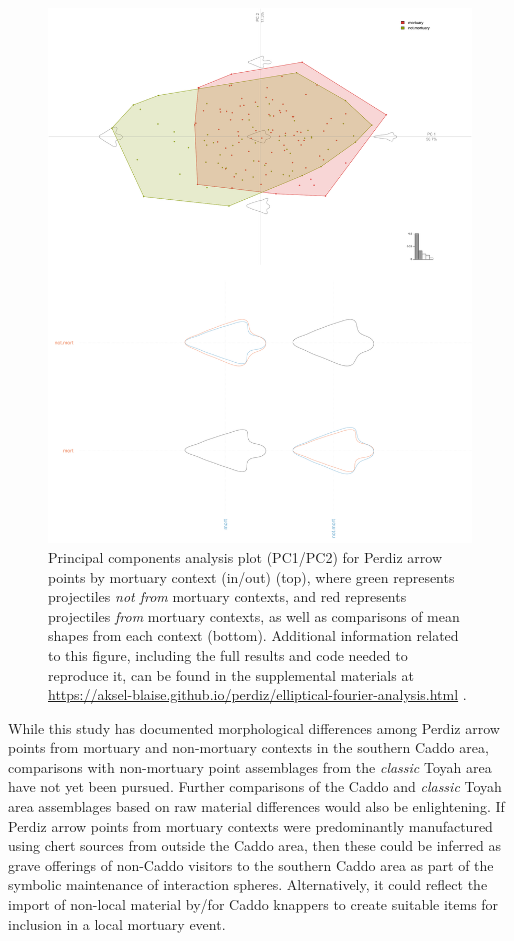 \documentclass[review]{elsarticle}
\begin{document}
\begin{figure}[!]\centering
\includegraphics[width=\linewidth]{context.pdf}
\caption{Principal components analysis plot (PC1/PC2) for Perdiz arrow points by mortuary context (in/out) (top), where green represents projectiles \textit{not from} mortuary contexts, and red represents projectiles \textit{from} mortuary contexts, as well as comparisons of mean shapes from each context (bottom). Additional information related to this figure, including the full results and code needed to reproduce it, can be found in the supplemental materials at \href{https://aksel-blaise.github.io/perdiz/elliptical-fourier-analysis.html}{https://aksel-blaise.github.io/perdiz/elliptical-fourier-analysis.html} \citep{RN8980}.}
\label{fig:gmcontext}
\end{figure}

While this study has documented morphological differences among Perdiz arrow points from mortuary and non-mortuary contexts in the southern Caddo area, comparisons with non-mortuary point assemblages from the \textit{classic} Toyah area have not yet been pursued. Further comparisons of the Caddo and \textit{classic} Toyah area assemblages based on raw material differences would also be enlightening. If Perdiz arrow points from mortuary contexts were predominantly manufactured using chert sources from outside the Caddo area, then these could be inferred as grave offerings of non-Caddo visitors to the southern Caddo area as part of the symbolic maintenance of interaction spheres. Alternatively, it could reflect the import of non-local material by/for Caddo knappers to create suitable items for inclusion in a local mortuary event.
\end{document}
